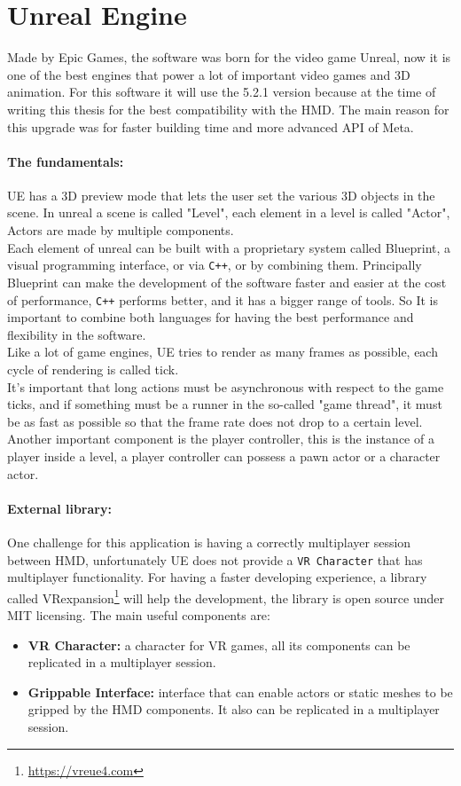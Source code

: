 \section{Unreal Engine}
\noindent
Made by Epic Games, the software was born for the video game Unreal,
now it is one of the best engines that power a lot of important video games and 3D animation. 
For this software it will use the 5.2.1 version because at the time of writing this thesis for the best compatibility with the \ac{HMD}. 
The main reason for this upgrade was for faster building time and more advanced \ac{API} of Meta. 

\paragraph{The fundamentals:}
\ac{UE} has a 3D preview mode that lets the user set the various 3D objects in the scene.
In unreal a scene is called "Level", each element in a level is called "Actor", Actors are made by multiple components.\\
Each element of unreal can be built with a proprietary system called Blueprint, a visual programming interface, or via \texttt{C++}, or by combining them.
Principally Blueprint can make the development of the software faster and easier at the cost of performance, \texttt{C++} performs better, and it has a bigger range of tools.
So It is important to combine both languages for having the best performance and flexibility in the software.\\
Like a lot of game engines, \ac{UE} tries to render as many frames as possible, each cycle of rendering is called tick.\\
It's important that long actions must be asynchronous with respect to the game ticks, and if something must be a runner in the so-called "game thread", it must be as fast as possible so that the frame rate does not drop to a certain level.\\
Another important component is the player controller, this is the instance of a player inside a level, a player controller can possess a pawn actor or a character actor.


\paragraph{External library:}
One challenge for this application is having a correctly multiplayer session between \ac{HMD}, unfortunately \ac{UE} does not provide a \texttt{VR Character} that has multiplayer functionality.
For having a faster developing experience, a library called VRexpansion\footnote{\url{https://vreue4.com}} will help the development, the library is open source under MIT licensing.
The main useful components are:
\begin{itemize}
  \item \textbf{VR Character:} a character for \ac{VR} games, all its components can be replicated in a multiplayer session.
  \item \textbf{Grippable Interface:}  interface that can enable actors or static meshes to be gripped by the \ac{HMD} components. It also can be replicated in a multiplayer session.
\end{itemize}

